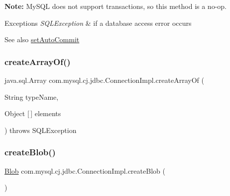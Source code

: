 {\bfseries Note\+:} My\+S\+QL does not support transactions, so this method is a no-\/op. 


\begin{DoxyExceptions}{Exceptions}
{\em S\+Q\+L\+Exception} & if a database access error occurs \\
\hline
\end{DoxyExceptions}
\begin{DoxySeeAlso}{See also}
\mbox{\hyperlink{classcom_1_1mysql_1_1cj_1_1jdbc_1_1_connection_impl_a53c90790a0e3d5c1ebae0278a15453be}{set\+Auto\+Commit}} 
\end{DoxySeeAlso}
\mbox{\label{classcom_1_1mysql_1_1cj_1_1jdbc_1_1_connection_impl_ab78e8344d43ead9e66d329c7d1121c1c}} 
\subsubsection{\texorpdfstring{create\+Array\+Of()}{createArrayOf()}}
{\footnotesize\ttfamily java.\+sql.\+Array com.\+mysql.\+cj.\+jdbc.\+Connection\+Impl.\+create\+Array\+Of (\begin{DoxyParamCaption}\item[{String}]{type\+Name,  }\item[{Object \mbox{[}$\,$\mbox{]}}]{elements }\end{DoxyParamCaption}) throws S\+Q\+L\+Exception}

\mbox{\label{classcom_1_1mysql_1_1cj_1_1jdbc_1_1_connection_impl_a04543522f0343da74c7f683036cc8ce1}} 
\subsubsection{\texorpdfstring{create\+Blob()}{createBlob()}}
{\footnotesize\ttfamily \mbox{\hyperlink{classcom_1_1mysql_1_1cj_1_1jdbc_1_1_blob}{Blob}} com.\+mysql.\+cj.\+jdbc.\+Connection\+Impl.\+create\+Blob (\begin{DoxyParamCaption}{ }\end{DoxyParamCaption})}

